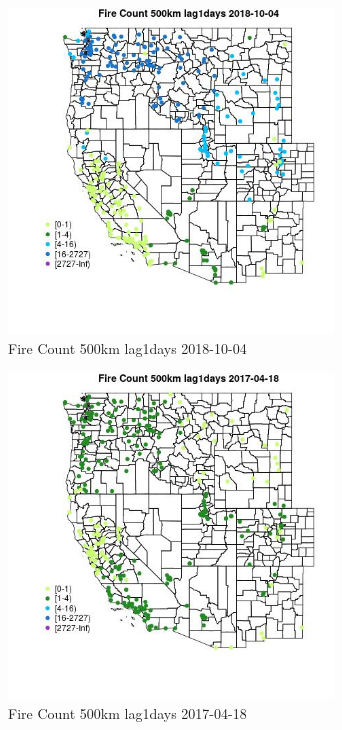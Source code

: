 \begin{figure} 
\centering  
\includegraphics[width=0.77\textwidth]{Code_Outputs/Report_ML_input_PM25_Step4_part_f_de_duplicated_aveswNAs_MapObsFire_Count_500km_lag1days2018-10-04.jpg} 
\caption{\label{fig:Report_ML_input_PM25_Step4_part_f_de_duplicated_aveswNAsMapObsFire_Count_500km_lag1days2018-10-04}Fire Count 500km lag1days 2018-10-04} 
\end{figure} 
 

\begin{figure} 
\centering  
\includegraphics[width=0.77\textwidth]{Code_Outputs/Report_ML_input_PM25_Step4_part_f_de_duplicated_aveswNAs_MapObsFire_Count_500km_lag1days2017-04-18.jpg} 
\caption{\label{fig:Report_ML_input_PM25_Step4_part_f_de_duplicated_aveswNAsMapObsFire_Count_500km_lag1days2017-04-18}Fire Count 500km lag1days 2017-04-18} 
\end{figure} 
 

